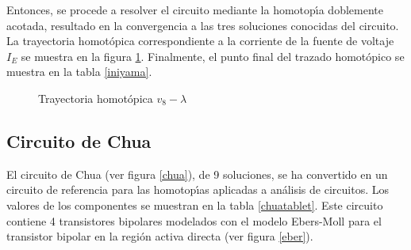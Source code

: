 \documentclass[conference,letterpaper,onecolumn]{IEEEtran}
\begin{document}
{Entonces,
se procede a resolver el circuito mediante la homotop\'{\i}a doblemente acotada,
resultado en la convergencia a las tres soluciones conocidas del circuito. La trayectoria homot\'opica
correspondiente a la corriente de la fuente de voltaje $I_E$ se muestra
en la figura \ref{yamaie}. Finalmente, el punto final del trazado homot\'opico se muestra en la tabla \ref{iniyama}.


\begin{table}[tbp]
{\small
{}
}
\caption{Soluciones del circuito de Yamamura}
\label{yamamuracircuitosoluc}
\end{table}



\begin{figure}[hbtp]
\centerline{
\epsfxsize=50mm
\epsfxsize=50mm
}
\caption{Trayectoria homot\'opica $v_8-\lambda$}
\label{yamaie}
\end{figure}


\subsection{Circuito de Chua}

El circuito de Chua \cite{homo_chua} (ver figura \ref{chua}), de 9 soluciones, se ha
convertido
en un circuito de re\-fe\-ren\-cia para las homotop\'{\i}as aplicadas a an\'alisis de
circuitos.
Los valores de los componentes se muestran en la tabla \ref{chuatablet}.
Este circuito contiene 4 transistores bipolares modelados con el modelo
Ebers-Moll para el transistor bipolar en la regi\'on activa directa (ver figura \ref{eber}).



}
\end{document}
